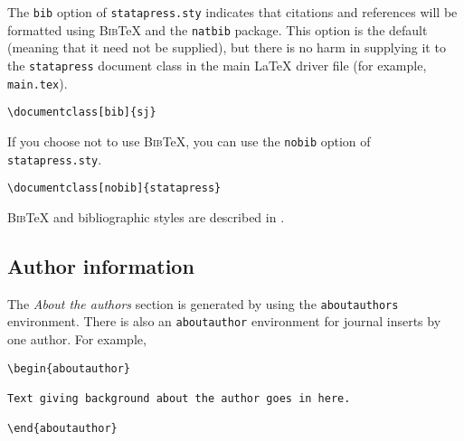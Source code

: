 The \texttt{bib} option of \texttt{statapress.sty} indicates that citations
and references will be formatted using \textsc{Bib}{\TeX} and the
\texttt{natbib} package.  This option is the default (meaning that it need not
be supplied), but there is no harm in supplying it to the \texttt{statapress}
document class in the main {\LaTeX} driver file (for example,
\texttt{main.tex}).

\begin{stverbatim}
\begin{verbatim}
\documentclass[bib]{sj}
\end{verbatim}
\end{stverbatim}

\noindent
If you choose not to use \textsc{Bib}{\TeX}, you can use the \texttt{nobib}
option of \texttt{statapress.sty}.

\begin{stverbatim}
\begin{verbatim}
\documentclass[nobib]{statapress}
\end{verbatim}
\end{stverbatim}

\noindent
\textsc{Bib}{\TeX}{} and bibliographic styles are described in
\citet*{latexcompanion}.

\subsection{Author information}

The {\sl About the authors\/} section is generated by using the
\texttt{aboutauthors} environment.  There is also an \texttt{aboutauthor}
environment for journal inserts by one author.  For example,

\begin{stverbatim}
\begin{verbatim}
\begin{aboutauthor}

Text giving background about the author goes in here.

\end{aboutauthor}
\end{verbatim}
\end{stverbatim}

\endinput
